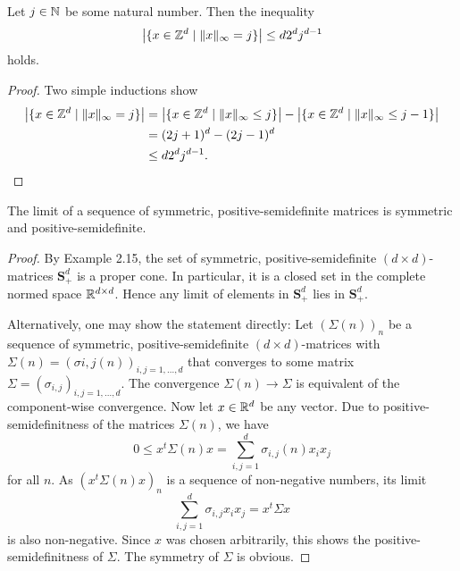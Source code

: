 \begin{lemma}
    Let $j \in \mathbb{N}$ be some natural number. Then the inequality
    \begin{equation} \label{number of lattice elements inequality}
        \left| \{ x \in \mathbb{Z}^d \mid \|x\|_{\infty} = j \} \right| \leq d 2^d j^{d-1}
    \end{equation}
    holds.
\end{lemma}
\begin{proof}
    Two simple inductions show
    \begin{align*} 
        \left| \{ x \in \mathbb{Z}^d \mid \|x\|_{\infty} = j \} \right|
        & = \left| \{ x \in \mathbb{Z}^d \mid \|x\|_{\infty} \leq j \} \right| - \left| \{ x \in \mathbb{Z}^d \mid \|x\|_{\infty} \leq j-1 \} \right| \nonumber \\
        & = (2j+1)^d - (2j-1)^d  \nonumber \\
        & \leq d 2^d j^{d-1}.
    \end{align*}
\end{proof}

\begin{lemma} \label{for lemma 3: limit of psd mat}
    The limit of a sequence of symmetric, positive-semidefinite matrices is symmetric and positive-semidefinite.
\end{lemma}
\begin{proof}
    By \cite{boyd2004convex} Example 2.15, the set of symmetric, positive-semidefinite $(d \times d)$-matrices $\mathbf{S}_+^d$ is a proper cone. In particular, it is a closed set in the complete normed space $\mathbb{R}^{d \times d}$. Hence any limit of elements in $\mathbf{S}_+^d$ lies in $\mathbf{S}_+^d$.

    Alternatively, one may show the statement directly: Let $(\Sigma(n))_n$ be a sequence of symmetric, positive-semidefinite $(d \times d)$-matrices with $\Sigma(n) = (\sigma{i, j}(n))_{i, j = 1, ..., d}$ that converges to some matrix $\Sigma = (\sigma_{i, j})_{i, j = 1, ..., d}$. The convergence $\Sigma(n) \to \Sigma$ is equivalent of the component-wise convergence. Now let $x \in \mathbb{R}^d$ be any vector. Due to positive-semidefinitness of the matrices $\Sigma(n)$, we have
    \[ 0 \leq x^t \Sigma(n) x = \sum\limits_{i, j = 1}^d \sigma_{i, j}(n) x_i x_j \]
    for all $n$. As $(x^t \Sigma(n) x)_n$ is a sequence of non-negative numbers, its limit
    \[ \sum\limits_{i, j = 1}^d \sigma_{i, j} x_i x_j = x^t \Sigma x \]
    is also non-negative. Since $x$ was chosen arbitrarily, this shows the po\-si\-tive-semi\-de\-fi\-nit\-ness of $\Sigma$. The symmetry of $\Sigma$ is obvious.
\end{proof}


